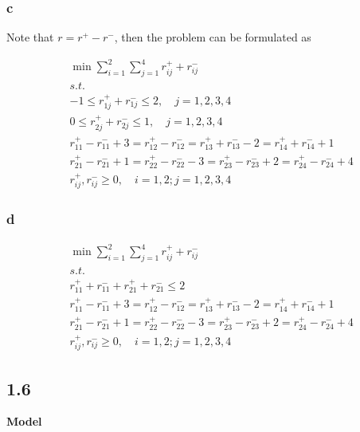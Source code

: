 \documentclass[11pt]{article}
\begin{document}
\hypertarget{c}{%
\subsubsection{c}\label{c}}

Note that \(r = r^+ - r^-\), then the problem can be formulated as

\[
\begin{align*}
    & \min\sum_{i=1}^2\sum_{j=1}^4 r_{ij}^{+} + r^{-}_{ij}\\
    & s.t. \\
    & -1 \leq r_{1j}^{+}+ r^{-}_{1j}\leq 2,\quad  j=1,2,3,4 \\
    & 0 \leq r_{2j}^{+}+ r^{-}_{2j}\leq 1,\quad  j=1,2,3,4\\
    & r_{11}^{+} - r^{-}_{11} + 3 = r_{12}^{+} - r^{-}_{12} = r_{13}^{+} + r^{-}_{13} - 2 = r_{14}^{+} + r^{-}_{14} + 1\\
    & r_{21}^{+} - r^{-}_{21} + 1 = r_{22}^{+} - r^{-}_{22} - 3 = r_{23}^{+} - r^{-}_{23} + 2  = r_{24}^{+} - r^{-}_{24} + 4\\
    & r_{ij}^{+}, r^{-}_{ij}\geq 0, \quad i=1,2; j=1,2,3,4
 \end{align*}
\]

\hypertarget{d}{%
\subsubsection{d}\label{d}}

\[
\begin{align*}
    & \min \sum_{i=1}^2\sum_{j=1}^4 r_{ij}^{+} + r^{-}_{ij} \\
    & s.t. \\
    & r_{11}^{+} + r^{-}_{11} + r_{21}^{+} + r^{-}_{21} \leq 2\\
    & r_{11}^{+} - r^{-}_{11} + 3 = r_{12}^{+} - r^{-}_{12} = r_{13}^{+} + r^{-}_{13} - 2 = r_{14}^{+} + r^{-}_{14} + 1\\
    & r_{21}^{+} - r^{-}_{21} + 1 = r_{22}^{+} - r^{-}_{22} - 3 = r_{23}^{+} - r^{-}_{23} + 2  = r_{24}^{+} - r^{-}_{24} + 4\\
    & r_{ij}^{+}, r^{-}_{ij}\geq 0, \quad i=1,2; j=1,2,3,4
 \end{align*}
\]

    \hypertarget{section}{%
\subsection{1.6}\label{section}}

\textbf{Model}
\end{document}
